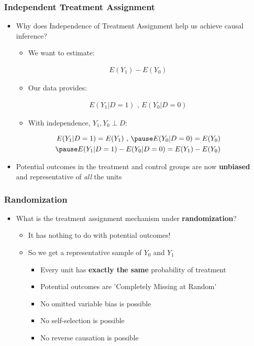 \documentclass[xcolor=x11names,compress]{beamer}\usepackage[]{graphicx}\usepackage[]{color}
\renewcommand{\(}{\begin{columns}}
\renewcommand{\)}{\end{columns}}
\newcommand{\<}[1]{\begin{column}{#1}}
\renewcommand{\>}{\end{column}}
\begin{document}
\begin{frame}
\frametitle{Independent Treatment Assignment}
\begin{itemize}
\item Why does Independence of Treatment Assignment help us achieve causal inference?
\begin{itemize}
\item We want to estimate:
\end{itemize}
\begin{eqnarray}
E(Y_1) - E(Y_0)
\end{eqnarray}
\pause
\begin{itemize}
\item Our data provides:
\end{itemize}
\begin{eqnarray}
E(Y_1|D=1)\text{ ,   }E(Y_0|D=0)
\end{eqnarray}
\pause
\begin{itemize}
\item With independence, $Y_1, Y_0 \perp D$:
\end{itemize}
\begin{eqnarray}
E(Y_1|D=1) = E(Y_1) \text{ ,   }  \pause E(Y_0|D=0) = E(Y_0) \\
\pause
E(Y_1|D=1) - E(Y_0|D=0) = E(Y_1) - E(Y_0) \\
\end{eqnarray}
\pause
\item Potential outcomes in the treatment and control groups are now \textbf{unbiased} and representative of \textit{all} the units
\end{itemize}
\end{frame}

\begin{frame}
\frametitle{Randomization}
\begin{itemize}
\item What is the treatment assignment mechanism under \textbf{randomization}?
\pause
\begin{itemize}
\item It has nothing to do with potential outcomes!
\pause
\item So we get a representative sample of $Y_0$ and $Y_1$
\pause
\begin{itemize}
\item Every unit has \textbf{exactly the same} probability of treatment
\pause
\item Potential outcomes are 'Completely Missing at Random'
\pause
\item No omitted variable bias is possible
\pause
\item No self-selection is possible
\pause
\item No reverse causation is possible
\end{itemize}
\end{itemize}
\end{itemize}
\end{frame}
\end{document}
